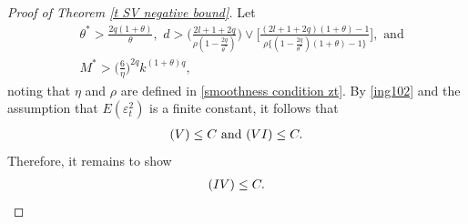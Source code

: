 \documentclass[ejsv2]{imsart}
\theoremstyle{plain}
\theoremstyle{definition}
\theoremstyle{remark}
\begin{document}
\begin{appendix}
\begin{proof}[Proof of Theorem \ref{t SV negative bound}]
{Let 
\begin{equation}\label{ing11118}
\begin{split}
     & \theta^\ast>\frac{2q(1+\theta)}{\theta},\,\,d>\bigg(\frac{2l+1+2q}{\rho(1-\frac{2q}{\theta^\ast})}\bigg)\vee\bigg[\frac{(2l+1+2q)(1+\theta)-1}{\rho\{(1-\frac{2q}{\theta^\star})(1+\theta)-1\}}\bigg], \,\,\mbox{and} \\
     & M^{\ast} >\big(\frac{6}{\eta}\big)^{2q}k^{(1+\theta)q},
\end{split}
\end{equation}
noting that $\eta$ and $\rho$
are defined in \eqref{smoothness condition zt}. By \eqref{ing102} and the assumption that $E(\varepsilon_t^2)$ is a finite constant,
it follows that
\begin{eqnarray}
\label{ing115}
{\rm (V)}\leq C  \,\,\mbox{and}\,\, {\rm (VI)}\leq C.
\end{eqnarray}} 
Therefore, it remains to show
\begin{eqnarray}
\label{ing116}
{\rm (IV)} \leq C.
\end{eqnarray}


\end{proof}
\end{appendix}
\end{document}
